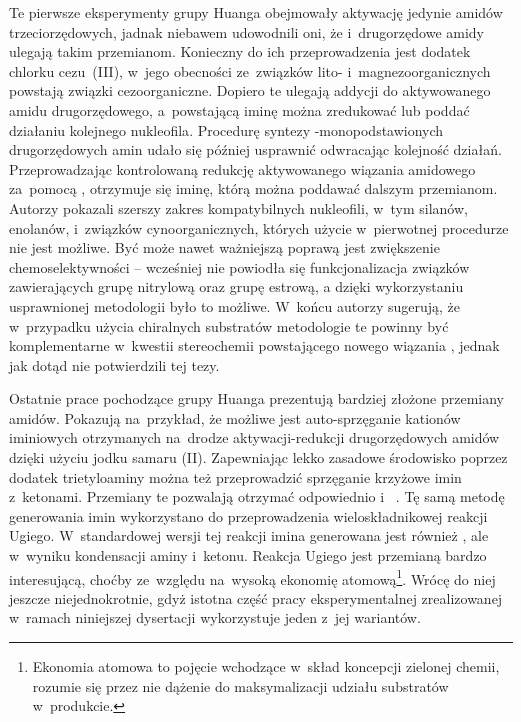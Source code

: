 Te pierwsze eksperymenty grupy Huanga obejmowały aktywację jedynie amidów trzeciorzędowych,
  jadnak niebawem udowodnili oni, że i~drugorzędowe amidy ulegają takim przemianom.
Konieczny do ich przeprowadzenia jest dodatek chlorku cezu~(III), w~jego obecności ze~związków lito- i~magnezoorganicznych
  powstają  związki cezoorganiczne.
Dopiero te ulegają addycji do aktywowanego amidu drugorzędowego,
  a~powstającą iminę można zredukować lub poddać działaniu kolejnego nukleofila\autocite{xiao12}.
Procedurę syntezy \textalpha-monopodstawionych drugorzędowych amin udało się później usprawnić odwracając kolejność działań.
Przeprowadzając kontrolowaną redukcję aktywowanego wiązania amidowego za~pomocą ,
  otrzymuje się iminę, którą można poddawać dalszym przemianom\autocite{huang15joc}.
Autorzy pokazali szerszy zakres kompatybilnych nukleofili, w~tym silanów, enolanów, i~związków cynoorganicznych,
  których użycie w~pierwotnej procedurze nie jest możliwe.
Być może nawet ważniejszą poprawą jest zwiększenie chemoselektywności \--- wcześniej nie powiodła się funkcjonalizacja
  związków zawierających grupę nitrylową oraz grupę estrową, a dzięki wykorzystaniu usprawnionej metodologii
  było to możliwe\autocite{huang15joc}.
W~końcu autorzy sugerują, że w~przypadku użycia chiralnych substratów metodologie te powinny być komplementarne
  w~kwestii stereochemii powstającego nowego wiązania , jednak jak dotąd nie potwierdzili tej tezy.

Ostatnie prace pochodzące grupy Huanga prezentują bardziej złożone przemiany amidów.
Pokazują na~przykład, że możliwe jest auto-sprzęganie kationów iminiowych  otrzymanych na~drodze
  aktywacji-redukcji drugorzędowych amidów  dzięki użyciu jodku samaru (II).
Zapewniając lekko zasadowe środowisko poprzez dodatek trietyloaminy można też przeprowadzić
  sprzęganie krzyżowe imin  z~ketonami.
Przemiany te pozwalają otrzymać odpowiednio  
  i~ \autocite{huang15comm}.
Tę samą metodę generowania imin wykorzystano do przeprowadzenia wieloskładnikowej reakcji Ugiego\autocite{zheng15}.
W~standardowej wersji tej reakcji imina  generowana jest również ,
  ale w~wyniku kondensacji aminy i~ketonu.
Reakcja Ugiego jest przemianą bardzo interesującą, choćby ze~względu na~wysoką ekonomię atomową\footnote{%
  Ekonomia atomowa to pojęcie wchodzące w~skład koncepcji zielonej chemii,
  rozumie się przez nie dążenie do maksymalizacji udziału substratów w~produkcie.
}.
Wrócę do niej jeszcze niejednokrotnie, gdyż istotna część pracy eksperymentalnej
  zrealizowanej w~ramach niniejszej dysertacji wykorzystuje jeden z~jej wariantów.

